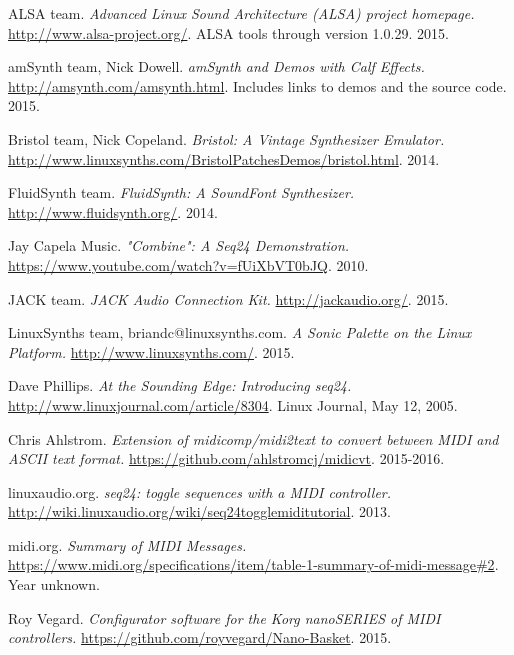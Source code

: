 \begin{thebibliography}{99}

   ALSA team.
   \emph{Advanced Linux Sound Architecture (ALSA) project homepage.}
   \url{http://www.alsa-project.org/}.
   ALSA tools through version 1.0.29.
   2015.

   amSynth team, Nick Dowell.
   \emph{amSynth and Demos with Calf Effects.}
   \url{http://amsynth.com/amsynth.html}.
   Includes links to demos and the source code.
   2015.

   Bristol team, Nick Copeland.
   \emph{Bristol: A Vintage Synthesizer Emulator.}
   \url{http://www.linuxsynths.com/BristolPatchesDemos/bristol.html}.
   2014.

   FluidSynth team.
   \emph{FluidSynth: A SoundFont Synthesizer.}
   \url{http://www.fluidsynth.org/}.
   2014.

   Jay Capela Music.
   \emph{"Combine": A Seq24 Demonstration.}
   \url{https://www.youtube.com/watch?v=fUiXbVT0bJQ}.
   2010.

   JACK team.
   \emph{JACK Audio Connection Kit.}
   \url{http://jackaudio.org/}.
   2015.

   LinuxSynths team, briandc@linuxsynths.com.
   \emph{A Sonic Palette on the Linux Platform.}
   \url{http://www.linuxsynths.com/}.
   2015.

   Dave Phillips.
   \emph{At the Sounding Edge: Introducing seq24.}
   \url{http://www.linuxjournal.com/article/8304}.
   Linux Journal, May 12, 2005.

   Chris Ahlstrom.
   \emph{Extension of midicomp/midi2text to convert between MIDI and ASCII
      text format.}
   \url{https://github.com/ahlstromcj/midicvt}.
   2015-2016.

   linuxaudio.org.
   \emph{seq24: toggle sequences with a MIDI controller.}
   \url{http://wiki.linuxaudio.org/wiki/seq24togglemiditutorial}.
   2013.

   midi.org.
   \emph{Summary of MIDI Messages.}
   \url{https://www.midi.org/specifications/item/table-1-summary-of-midi-message#2}.
   Year unknown.

   Roy Vegard.
   \emph{Configurator software for the Korg nanoSERIES of MIDI controllers.}
   \url{https://github.com/royvegard/Nano-Basket}.
   2015.


\end{thebibliography}
